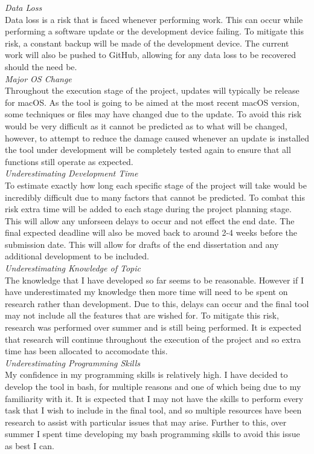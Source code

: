 \documentclass[11pt,a4paper]{article}
\newcommand\tab[1][0.5cm]{\hspace*{#1}}
\begin{document}
\tab\textit{Data Loss}\\
Data loss is a risk that is faced whenever performing work. This can occur while performing a software update or the development device failing. To mitigate this risk, a constant backup will be made of the development device. The current work will also be pushed to GitHub, allowing for any data loss to be recovered should the need be.\\

\textit{Major OS Change}\\
Throughout the execution stage of the project, updates will typically be release for macOS. As the tool is going to be aimed at the most recent macOS version, some techniques or files may have changed due to the update. To avoid this risk would be very difficult as it cannot be predicted as to what will be changed, however, to attempt to reduce the damage caused whenever an update is installed the tool under development will be completely tested again to ensure that all functions still operate as expected.\\

\textit{Underestimating Development Time}\\
To estimate exactly how long each specific stage of the project will take would be incredibly difficult due to many factors that cannot be predicted. To combat this risk extra time will be added to each stage during the project planning stage. This will allow any unforseen delays to occur and not effect the end date. The final expected deadline will also be moved back to around 2-4 weeks before the submission date. This will allow for drafts of the end dissertation and any additional development to be included.\\

\textit{Underestimating Knowledge of Topic}\\
The knowledge that I have developed so far seems to be reasonable. However if I have underestimated my knowledge then more time will need to be spent on research rather than development. Due to this, delays can occur and the final tool may not include all the features that are wished for. To mitigate this risk, research was performed over summer and is still being performed. It is expected that research will continue throughout the execution of the project and so extra time has been allocated to accomodate this.\\

\textit{Underestimating Programming Skills}\\
My confidence in my programming skills is relatively high. I have decided to develop the tool in bash, for multiple reasons and one of which being due to my familiarity with it. It is expected that I may not have the skills to perform every task that I wish to include in the final tool, and so multiple resources have been research to assist with particular issues that may arise. Further to this, over summer I spent time developing my bash programming skills to avoid this issue as best I can.\\
\end{document}
